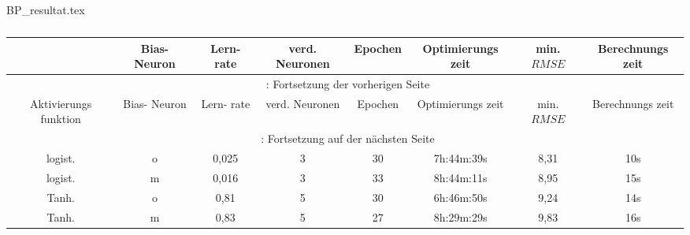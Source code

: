 
\begin{filecontents*}{BP_resultat.tex}
{
\captionsetup{skip=1pt,margin=5pt,position=below} %

\begin{longtable}{cccccccc}
    \caption{} \label{tab:BP_resultat}\\
    \toprule
    \hiderowcolors

       \multicolumn{1}{Y}{Aktivierungs funktion} &      \multicolumn{1}{Y}{Bias- Neuron} &   \multicolumn{1}{Y}{Lern- rate} &  \multicolumn{1}{Y}{verd. Neuronen} &  \multicolumn{1}{Y}{Epochen} &  \multicolumn{1}{Y}{Optimierungs zeit} & \multicolumn{1}{Y}{min. $RMSE$}  & \multicolumn{1}{Y}{Berechnungs zeit} \\

    \midrule
    \endfirsthead
        \multicolumn{8}{c}{\footnotesize \tablename\ \thetable{}: Fortsetzung der vorherigen Seite} \\
    \toprule
       \multicolumn{1}{Y}{Aktivierungs funktion} &      \multicolumn{1}{Y}{Bias- Neuron} &   \multicolumn{1}{Y}{Lern- rate} &  \multicolumn{1}{Y}{verd. Neuronen} &  \multicolumn{1}{Y}{Epochen} &  \multicolumn{1}{Y}{Optimierungs zeit} & \multicolumn{1}{Y}{min. $RMSE$}  & \multicolumn{1}{Y}{Berechnungs zeit} \\
    \midrule
    \endhead
    \midrule
        \multicolumn{8}{c}{{\footnotesize \tablename\ \thetable{}: Fortsetzung auf der nächsten Seite}} \\
    \bottomrule
    \endfoot
    \bottomrule

        
    \endlastfoot
    \showrowcolors
        logist.                 & o       & 0,025 & 3         & 30  & 7h:44m:39s & 8,31 & 10s         \\
        logist.                 & m       & 0,016 & 3         & 33  & 8h:44m:11s & 8,95 & 15s         \\
        Tanh.                   & o       & 0,81  & 5         & 30  & 6h:46m:50s & 9,24 & 14s         \\
        Tanh.                   & m       & 0,83  & 5         & 27  & 8h:29m:29s & 9,83 & 16s         \\

        
\end{longtable}

}
\end{filecontents*}

